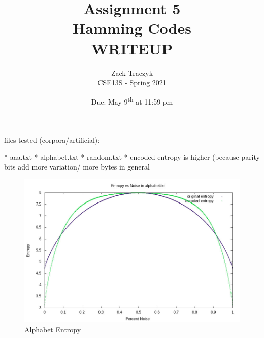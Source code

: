 \documentclass[12pt]{article}
\title{%
	\textbf{Assignment 5 \\ 
		Hamming Codes \\
\large WRITEUP} }
\author{Zack Traczyk \\ CSE13S - Spring 2021}
\date{Due: May 9\textsuperscript{th} at 11:59 pm}
\begin{document}
\maketitle

files tested (corpora/artificial):

  * aaa.txt
  * alphabet.txt
  * random.txt
* encoded entropy is higher (because parity bits add more variation/ more bytes
in general

\begin{figure}[H]
	\caption{Alphabet Entropy}\label{alphabet_entropy}
	\includegraphics[width=6.5in]{alphabet.txt.entropy.jpg}
	\centering
\end{figure}
\end{document}
